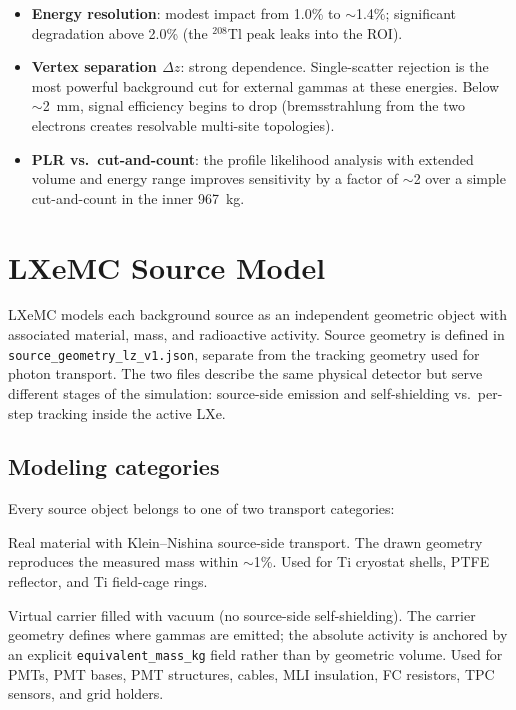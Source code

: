 \documentclass[11pt]{article}
\begin{document}
\begin{itemize}
\item \textbf{Energy resolution}: modest impact from 1.0\% to
  $\sim$1.4\%; significant degradation above 2.0\% (the $^{208}$Tl
  peak leaks into the ROI).

\item \textbf{Vertex separation $\Delta z$}: strong dependence.
  Single-scatter rejection is the most powerful background cut for
  external gammas at these energies.  Below $\sim$2~mm, signal
  efficiency begins to drop (bremsstrahlung from the two electrons
  creates resolvable multi-site topologies).

\item \textbf{PLR vs.\ cut-and-count}: the profile likelihood
  analysis with extended volume and energy range improves sensitivity
  by a factor of $\sim$2 over a simple cut-and-count in the inner
  967~kg.
\end{itemize}

\section{LXeMC Source Model}

LXeMC models each background source as an independent geometric
object with associated material, mass, and radioactive activity.
Source geometry is defined in \texttt{source\_geometry\_lz\_v1.json},
separate from the tracking geometry used for photon transport.  The
two files describe the same physical detector but serve different
stages of the simulation: source-side emission and self-shielding
vs.\ per-step tracking inside the active LXe.

\subsection{Modeling categories}

Every source object belongs to one of two transport categories:

\begin{description}[leftmargin=2.0cm,style=nextline]
\item[\texttt{exact}] Real material with Klein--Nishina source-side
  transport.  The drawn geometry reproduces the measured mass within
  $\sim$1\%.  Used for Ti cryostat shells, PTFE reflector, and Ti
  field-cage rings.

\item[\texttt{mass\_equivalent}] Virtual carrier filled with vacuum
  (no source-side self-shielding).  The carrier geometry defines where
  gammas are emitted; the absolute activity is anchored by an explicit
  \texttt{equivalent\_mass\_kg} field rather than by geometric volume.
  Used for PMTs, PMT bases, PMT structures, cables, MLI insulation,
  FC resistors, TPC sensors, and grid holders.
\end{description}
\end{document}
